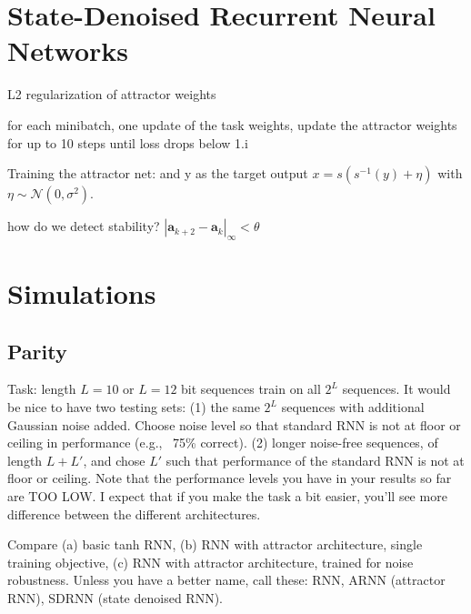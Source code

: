 \documentclass{article}
\begin{document}
\section{State-Denoised Recurrent Neural Networks}
L2 regularization of attractor weights 

for each minibatch, one update of the task weights, update the attractor weights for up to 10 steps until loss drops below 1.i


Training the attractor net:
and y as the target output
$x = s ( s^{-1}(y) + \eta )$ with $\eta \sim \mathcal{N}(0,\sigma^2)$.

how do we detect stability? $|\bm{a}_{k+2}-\bm{a}_k|_\infty < \theta$

\section{Simulations}

\subsection{Parity}


Task: length $L=10$ or $L=12$ bit sequences train on all $2^L$ sequences.  
It would be nice to have two testing sets:  (1) the same $2^L$ sequences 
with additional Gaussian noise added.  Choose noise level so that standard 
RNN is not at floor or ceiling in performance (e.g., ~75\% correct).
(2) longer noise-free sequences, of length $L+L\prime$, and chose $L\prime$
such that performance of the standard RNN is not at floor or ceiling.
Note that the performance levels you have in your results so far are TOO 
LOW. I expect that if you make the task a bit easier, you'll see more
difference between the different architectures.

Compare (a) basic tanh RNN, (b) RNN with attractor architecture,
single training objective, (c) RNN with attractor architecture, trained 
for noise robustness. Unless you have a better name, call these: RNN, ARNN
(attractor RNN), SDRNN (state denoised RNN).
\end{document}

